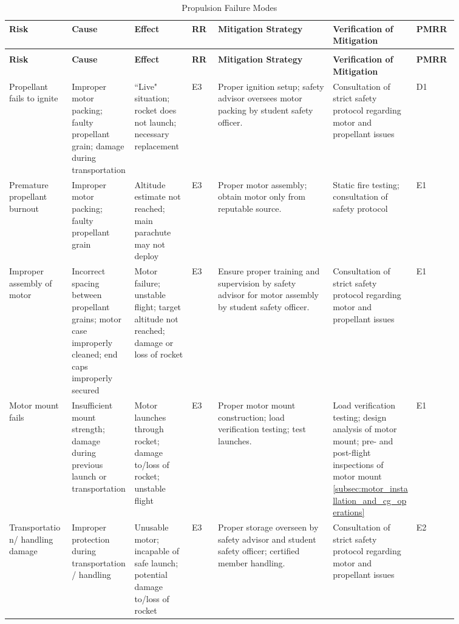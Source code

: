 \begin{footnotesize}
\begin{longtable}{|L{0.12\linewidth}|L{0.12\linewidth}|L{0.11\linewidth}|C{0.05\linewidth}|L{0.22\linewidth}|L{0.16\linewidth}|C{0.08\linewidth}|}
	\caption{Propulsion Failure Modes}\label{table:propulsion_failure_modes}\\ \hline
	 \textbf{Risk} & \textbf{Cause} & \textbf{Effect} & \textbf{RR} & \textbf{Mitigation Strategy} & \textbf{Verification of Mitigation} & \textbf{PMRR} \\
	\hline
	\endfirsthead
	\caption*{Propulsion Failure Modes}\\ \hline
	 \textbf{Risk} & \textbf{Cause} & \textbf{Effect} & \textbf{RR} & \textbf{Mitigation Strategy} & \textbf{Verification of Mitigation} & \textbf{PMRR} \\
	\hline
	\endhead
	Propellant fails to ignite & Improper motor packing; faulty propellant grain; damage during transportation & ``Live" situation; rocket does not launch; necessary replacement &  E3 & Proper ignition setup; safety advisor oversees motor packing by student safety officer. & Consultation of strict safety protocol regarding motor and propellant issues &  D1 \\
	\hline
	Premature propellant burnout & Improper motor packing; faulty propellant grain & Altitude estimate not reached; main parachute may not deploy &  E3 & Proper motor assembly; obtain motor only from reputable source. & Static fire testing; consultation of safety protocol &  E1 \\
	\hline
	Improper assembly of motor & Incorrect spacing between propellant grains; motor case improperly cleaned; end caps improperly secured & Motor failure; unstable flight; target altitude not reached; damage or loss of rocket &  E3 & Ensure proper training and supervision by safety advisor for motor assembly by student safety officer. & Consultation of strict safety protocol regarding motor and propellant issues &  E1 \\
	\hline
	Motor mount fails & Insufficient mount strength; damage during previous launch or transportation & Motor launches through rocket; damage to/loss of rocket; unstable flight &  E3 & Proper motor mount construction; load verification testing; test launches. & Load verification testing; design analysis of motor mount; pre- and post-flight inspections of motor mount \ref{subsec:motor_installation_and_cg_operations} &  E1 \\
	\hline
	Transportation/ handling damage & Improper protection during transportation/ handling & Unusable motor; incapable of safe launch; potential damage to/loss of rocket &  E3 & Proper storage overseen by safety advisor and student safety officer; certified member handling. & Consultation of strict safety protocol regarding motor and propellant issues &  E2 \\

\end{longtable}
\end{footnotesize}
